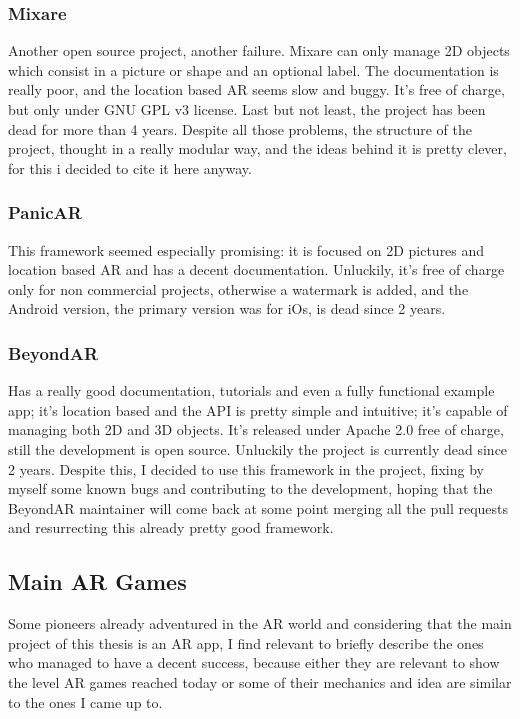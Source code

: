 			\subsubsection{Mixare}
			
				Another open source project, another failure. Mixare can only manage 2D objects which consist in a picture or shape and an optional label. The documentation is really poor, and the location based AR seems slow and buggy. It's free of charge, but only under GNU GPL v3 license. Last but not least, the project has been dead for more than 4 years.
				Despite all those problems, the structure of the project, thought in a really modular way, and the ideas behind it is pretty clever, for this i decided to cite it here anyway.
			
			\subsubsection{PanicAR}
			
				This framework seemed especially promising: it is focused on 2D pictures and location based AR and has a decent documentation.
				Unluckily, it's free of charge only for non commercial projects, otherwise a watermark is added, and the Android version, the primary version was for iOs, is dead since 2 years.
			
			\subsubsection{BeyondAR}
			
				Has a really good documentation, tutorials and even a fully functional example app; it's location based and the API is pretty simple and intuitive; it's capable of managing both 2D and 3D objects. It's released under Apache 2.0 free of charge, still the development is open source.
				Unluckily the project is currently dead since 2 years. Despite this, I decided to use this framework in the project, fixing by myself some known bugs and contributing to the development, hoping that the BeyondAR maintainer will come back at some point merging all the pull requests and resurrecting this already pretty good framework.
		
		\subsection{Main AR Games}
		\label{soa:games}
		
			Some pioneers already adventured in the AR world and considering that the main project of this thesis is an AR app, I find relevant to briefly describe the ones who managed to have a decent success, because either they are relevant to show the level AR games reached today or some of their mechanics and idea are similar to the ones I came up to.
		
